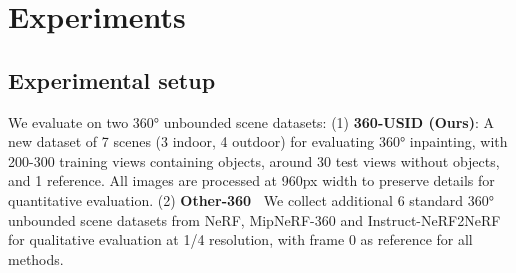 \section{Experiments}

\subsection{Experimental setup}

We evaluate on two 360° unbounded scene datasets:
(1) \textbf{360-USID (Ours)}: A new dataset of 7 scenes (3 indoor, 4 outdoor) for evaluating 360° inpainting, with 200-300 training views containing objects, around 30 test views without objects, and 1 reference. All images are processed at 960px width to preserve details for quantitative evaluation.
(2) \textbf{Other-360~\citep{barron2022mip}} We collect additional 6 standard 360° unbounded scene datasets from NeRF\cite{mildenhall2020nerf}, MipNeRF-360\citep{barron2022mip} and Instruct-NeRF2NeRF\cite{haque2023instruct} for qualitative evaluation at 1/4 resolution, with frame 0 as reference for all methods.

